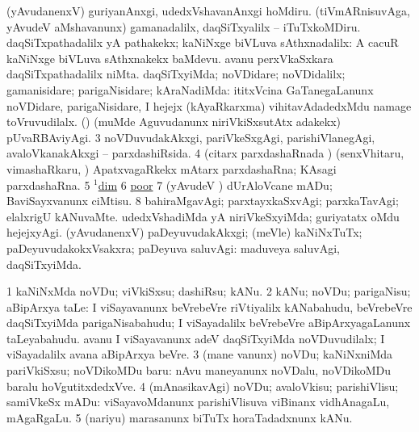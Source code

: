 \noindent 
\gl{\pagu}
\expl{}
\bmng
\bnum
{}  
\banum
{} (yAvudanenxV) guriyanAnxgi, udedxVshavanAnxgi hoMdiru. 
 (tiVmARnisuvAga, yAvudeV aMshavanunx) gamanadalilx, daqSiTxyalilx -- iTuTxkoMDiru. 
\eanum
\numie
{}  
\banum
{} daqSiTxpathadalilx yA pathakekx; kaNiNxge biVLuva sAthxnadalilx:  A cacuR kaNiNxge biVLuva sAthxnakekx baMdevu.  avanu perxVkaSxkara daqSiTxpathadalilx niMta. 
 daqSiTxyiMda; noVDidare; noVDidalilx; gamanisidare; parigaNisidare; kAraNadiMda:  ititxVcina GaTanegaLanunx noVDidare, parigaNisidare, I hejejx (kAyaRkarxma) vihitavAdadedxMdu namage toVruvudilalx. 
 (\pArxparx) (muMde Aguvudanunx niriVkiSxsutAtx adakekx) pUvaRBAviyAgi. 
\eanum
\numie
\num{3}  noVDuvudakAkxgi, pariVkeSxgAgi, parishiVlanegAgi, avaloVkanakAkxgi -- parxdashiRsida. 
\num{4}  (citarx parxdashaRnada \vi) (senxVhitaru, vimashaRkaru, \mo) ApatxvagaRkekx mAtarx parxdashaRna; KAsagi parxdashaRna. 
\num{5}  \hyperref{kandict_d.pdf}{D}{dim(1) nuga}{$^1$dim}  
\num{6}  \hyperref{kandict_p.pdf}{P}{poor pagu(3)}{poor}  
\num{7}  (yAvudeV \vi) dUrAloVcane mADu; BaviSayxvanunx ciMtisu. 
\num{8}  bahiraMgavAgi; parxtayxkaSxvAgi; parxkaTavAgi; elalxrigU kANuvaMte. 
  
\banum
{} udedxVshadiMda yA niriVkeSxyiMda; guriyatatx oMdu hejejxyAgi. 
 (yAvudanenxV) paDeyuvudakAkxgi; (meVle) kaNiNxTuTx; paDeyuvudakokxVsakxra; paDeyuva saluvAgi:  maduveya saluvAgi, daqSiTxyiMda. 
\eanum
\numie
\enum
\emng
\eentry

\bentry 
{} 
\gl{\sakirx}
\expl{}
\bmng
\bnum
\num{1} kaNiNxMda noVDu; viVkiSxsu; dashiRsu; kANu. 
\num{2} kANu; noVDu; parigaNisu; aBipArxya taLe:  I viSayavanunx beVrebeVre riVtiyalilx kANabahudu, beVrebeVre daqSiTxyiMda parigaNisabahudu; I viSayadalilx beVrebeVre aBipArxyagaLanunx taLeyabahudu.  avanu I viSayavanunx adeV daqSiTxyiMda noVDuvudilalx; I viSayadalilx avana aBipArxya beVre. 
\num{3} (mane \mo vanunx) noVDu; kaNiNxniMda pariVkiSxsu; noVDikoMDu baru:  nAvu maneyanunx noVDalu, noVDikoMDu baralu hoVgutitxdedxVve. 
\num{4} (mAnasikavAgi) noVDu; avaloVkisu; parishiVlisu; samiVkeSx mADu:  viSayavoMdanunx parishiVlisuva viBinanx vidhAnagaLu, mAgaRgaLu. 
\num{5} (nariyu) marasanunx biTuTx horaTadadxnunx kANu. 
\enum
\emng

